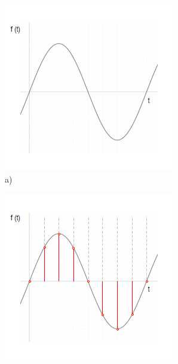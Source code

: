 \documentclass[a4paper, 12pt]{article}
\begin{document}
\begin{figure}[h!]
\centering
\begin{minipage}[c]{5cm}
  \centering
  \includegraphics[width=\linewidth]{analogový.png}\\
  a)
  \captionsetup{labelformat=empty}
\end{minipage}\hspace{1cm}
\begin{minipage}[c]{5cm}
  \centering
  \includegraphics[width=\linewidth]{vzorkovaný.png}\\

\end{minipage}
\end{figure}
\end{document}
